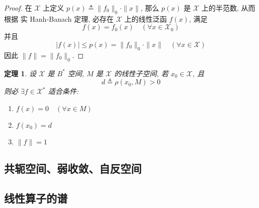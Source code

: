 \documentclass[12pt,a4paper]{article}
\newtheorem{thm}{定理}[subsection]  %
\begin{document}
\begin{proof}
    在 $\mathscr{X}$ 上定义 $p(x) \triangleq \|f_0\|_0 \cdot \|x\|$, 那么 $p(x)$ 是 $\mathscr{X}$ 上的半范数, 
    从而根据 实 Hanh-Banach 定理, 必存在 $\mathscr{X}$ 上的线性泛函 $f(x)$, 满足
    \[f(x) = f_0(x) \quad (\forall x \in \mathscr{X}_0)\]并且
    \[ |f(x)| \leq p(x) = \|f_0\|_0 \cdot \|x\| \quad (\forall x \in \mathscr{X})\]
    因此 $\|f\| = \|f_0\|_0$.
\end{proof}
\begin{thm}
    设 $\mathscr{X}$ 是 $B^*$ 空间, $M$ 是 $\mathscr{X}$ 的线性子空间, 若 $x_0 \in \mathscr{X}$, 且
    \[d \triangleq \rho (x_0, M) > 0\] 则必 $\exists f \in \mathscr{X}^*$ 适合条件:
    \begin{enumerate}[label=(\roman*),font=\upshape]
        \item $f(x) = 0 \quad (\forall x \in M)$
        \item $f(x_0) = d$
        \item $\|f\| =1$
    \end{enumerate}
\end{thm}
\subsection{共轭空间、弱收敛、自反空间}
\subsection{线性算子的谱}
\end{document}
